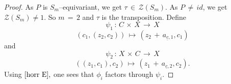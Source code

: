 \documentclass[10pt,a4paper]{amsart}
\theoremstyle{plain}
\theoremstyle{definition}
\theoremstyle{remark}
\begin{document}
\begin{proof}
As $P$ is $S_{m}$--equivariant, we get $\tau\,\in\, \mathcal{Z}(S_{m})$. As $P\,\neq\, {id}$, we get $\mathcal{Z}(S_{m})\neq 1$. So $m\,=\,2$ and $\tau$ is the transposition. Define
\begin{equation*}
\psi_{1}\,:\, C\,\times\, X\,\longrightarrow\, X    
\end{equation*}
\begin{equation*}
(c_{1}, (z_{2}, c_{2}))\,\mapsto \, (z_{2}\,+\, a_{\underline{c},1},c_{1})    
\end{equation*}
and 
\begin{equation*}
\psi_{2}\,:\, X\,\times\, C\,\longrightarrow\, X    
\end{equation*}
\begin{equation*}
((z_{1}, c_{1}), c_{2})\,\mapsto\,(z_{1}\,+\, a_{\underline{c},2}, c_{2}).    
\end{equation*}
Using $\eqref{horr E},$ one sees that $\phi_{i}$ factors through $\psi_{i}$.
\end{proof}
\end{document}
